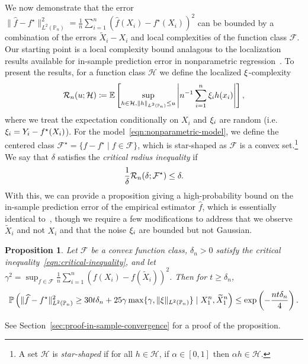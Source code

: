 \documentclass[11pt]{article}
\newcommand{\E}{\mathbb{E}}
\newcommand{\Prb}{\mathbb{P}}
\renewcommand{\P}{\mathbb{P}}
\newcommand{\mc}[1]{\mathcal{#1}}
\newcommand{\what}[1]{\widehat{#1}}
\newcommand{\wt}[1]{\widetilde{#1}}
\newcommand{\norms}[1]{\|{#1}\|} %
\newcommand{\<}{\langle} %
\renewcommand{\>}{\rangle}
\newcommand{\defeq}{\coloneqq}
\newcommand{\LtwoPns}[1]{\norms{#1}_{L^2(\Prb_n)}}
\newcommand{\opt}{^\star}
\newtheorem{proposition}{Proposition}
\begin{document}
We now demonstrate that the error $\LtwoPns{\what{f} - f\opt}^2 =
\frac{1}{n} \sum_{i = 1}^n (\what{f}(X_i) - f\opt(X_i))^2$ can be bounded by
a combination of the errors $\wt{X}_i - X_i$ and local complexities of the
function class $\mc{F}$.  Our starting point is a local complexity bound
analagous to the localization results available for in-sample prediction
error in nonparametric regression~\cite[cf.][Thm.~13.5]{Wainwright19}.  To
present the results, for a function class $\mc{H}$ we define the
localized $\xi$-complexity
\begin{equation*}
  \localcomplexity_n(u; \mc{H})
  \defeq \E\left[ \sup_{h \in \mc{H},
      \LtwoPns{h} \le u}
    \left|n^{-1} \sum_{i = 1}^n \noise_i h(x_i) \right| \right],
\end{equation*}
where we treat the expectation conditionally on $X_i$ and $\xi_i$ are
random (i.e.\ $\noise_i = Y_i - f\opt(X_i)$).  For the
model~\eqref{eqn:nonparametric-model}, we define the centered class
$\mc{F}\opt = \{f - f\opt \mid f \in \mc{F}\}$, which is star-shaped as
$\mc{F}$ is a convex set.\footnote{ A set $\mc{H}$ is \emph{star-shaped} if
  for all $h \in \mc{H}$, if $\alpha \in [0, 1]$ then $\alpha h \in
  \mc{H}$.}  We say that $\delta$ satisfies the \emph{critical radius
  inequality} if
\begin{equation}
  \frac{1}{\delta} \localcomplexity_n(\delta; \mc{F}\opt)
  \le \delta.
  \label{eqn:critical-inequality}
\end{equation}
With this, we can provide a proposition giving a high-probability
bound on the in-sample prediction
error of the empirical estimator $\what{f}$, which is essentially
identical to~\cite[Thm.~13.5]{Wainwright19}, though we require a few
modifications to address that we observe $\wt{X}_i$ and not $X_i$
and that the noise $\xi_i$ are bounded but not Gaussian.
\begin{proposition}
  \label{proposition:in-sample-convergence}
  Let $\mc{F}$ be a convex function class, $\delta_n > 0$ satisfy the
  critical inequality~\eqref{eqn:critical-inequality},
  and let
  $\gamma^2 = \sup_{f \in \mc{F}}
  \frac{1}{n} \sum_{i = 1}^n (f(X_i) - f(\wt{X}_i))^2$.
  Then for $t \ge \delta_n$,
  \begin{equation*}
    \P\left(\LtwoPns{\what{f} - f\opt}^2 \ge 30 t \delta_n
    + 25 \gamma \max\{\gamma, \LtwoPns{\noise}\}
    \mid X_1^n, \wt{X}_1^n
    \right)
    \le \exp\left(-\frac{n t \delta_n}{4}\right).
  \end{equation*}
\end{proposition}
\noindent
See Section~\ref{sec:proof-in-sample-convergence} for a proof of the
proposition.
\end{document}
